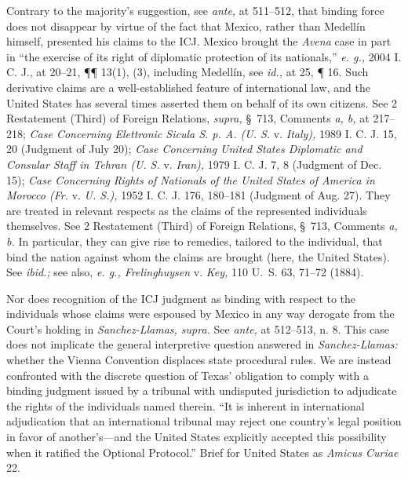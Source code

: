  Contrary to the majority's suggestion, see \emph{ante,} at
511--512, that binding force does not disappear by virtue of the
fact that Mexico, rather than Medellín himself, presented his claims
to the ICJ. Mexico brought the \emph{Avena} case in part in ``the
exercise of its right of diplomatic protection of its nationals,''
\emph{e. g.,} 2004 I. C. J., at 20--21, ¶¶ 13(1), (3), including
Medellín, see \emph{id.,} at 25, ¶ 16. Such derivative claims are a
well-established feature of international law, and the United States
has several times asserted them on behalf of its own citizens. See 2
Restatement (Third) of Foreign Relations, \emph{supra,} \S~713, Comments
\emph{a, b,} at 217--218; \emph{Case Concerning Elettronic Sicula S. p. A.
(U. S.} v. \emph{Italy),} 1989 I. C. J. 15, 20 (Judgment of July 20);
\emph{Case Concerning United States Diplomatic and Consular Staff in Tehran
(U. S.} v. \emph{Iran),} 1979 I. C. J. 7, 8 (Judgment of Dec. 15); \emph{Case
Concerning} \newpage  \emph{Rights of Nationals of the United States of
America in Morocco (Fr.} v. \emph{U. S.),} 1952 I. C. J. 176, 180--181
(Judgment of Aug. 27). They are treated in relevant respects as the
claims of the represented individuals themselves. See 2 Restatement
(Third) of Foreign Relations, \S~713, Comments \emph{a, b.} In
particular, they can give rise to remedies, tailored to the individual,
that bind the nation against whom the claims are brought (here, the
United States). See \emph{ibid.;} see also, \emph{e. g., Frelinghuysen} v.
\emph{Key,} 110 U.~S. 63, 71--72 (1884).

  Nor does recognition of the ICJ judgment as binding with respect
to the individuals whose claims were espoused by Mexico in any way
derogate from the Court's holding in \emph{Sanchez-Llamas, supra.} See
\emph{ante,} at 512--513, n. 8. This case does not implicate the general
interpretive question answered in \emph{Sanchez-Llamas:} whether the Vienna
Convention displaces state procedural rules. We are instead confronted
with the discrete question of Texas' obligation to comply with a
binding judgment issued by a tribunal with undisputed jurisdiction
to adjudicate the rights of the individuals named therein. ``It is
inherent in international adjudication that an international tribunal
may reject one country's legal position in favor of another's---and
the United States explicitly accepted this possibility when it ratified
the Optional Protocol.'' Brief for United States as \emph{Amicus Curiae}
22.

